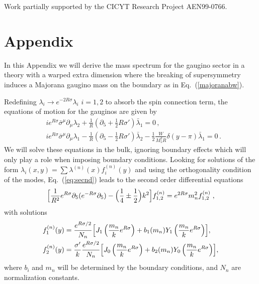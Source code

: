 \documentclass[a4paper,12pt]{article}
\begin{document}
Work  partially supported by the CICYT Research Project
AEN99-0766.

\newpage

\section*{Appendix}

In this Appendix we will derive the mass spectrum  for the gaugino
sector in a theory with a warped extra dimension 
where the breaking of supersymmetry 
induces a 
Majorana gaugino mass on the boundary as in Eq.~(\ref{majoranabw}).

Redefining $\lambda_i \rightarrow
e^{-2R\sigma} \lambda_i$ $i=1,2$ to absorb the spin connection term, the
equations of motion for the gauginos are given by
\begin{align}
    &i e^{R\sigma }\bar{\sigma}^{\mu}\partial_{\mu} \lambda_{2} +
  \frac{1}{R}(\partial_{5} + \frac{1}{2}R \sigma')\bar{\lambda}_1 = 0\, ,
\nonumber\\
    &i e^{R\sigma }\bar{\sigma}^{\mu}\partial_{\mu} \lambda_{1} -
    \frac{1}{R}(\partial_{5} - \frac{1}{2}R \sigma')\bar{\lambda}_2 -
    \frac{1}{2}\frac{W}{M_{5}^{3} R} \delta(y - \pi) 
\bar{\lambda}_{1}= 0\, . 
\label{eq:secnd}
\end{align}
We will solve these equations in the bulk, ignoring boundary effects
which will only play a role when imposing boundary conditions. Looking for
solutions of the form $\lambda_i(x,y)= \sum \lambda^{(n)}(x)
f^{(n)}_{i}(y)$ and using the orthogonality condition of the
modes, Eq.~(\ref{eq:secnd}) leads to
the second order differential equations
\begin{equation}
\Bigl[\frac{1}{R^2}
e^{R\sigma }\partial_{5}(e^{-R\sigma } \partial_{5}) -
\Bigl(\frac{1}{4}\pm \frac{1}{2}\Bigr)k^{2}\Bigr]
f^{(n)}_{1,2} =  e^{2R \sigma } m_n^2 f^{(n)}_{1,2}\;,\label{eq:KKdifeq}
\end{equation}
with solutions
\begin{align}
    f^{(n)}_1(y) & = \frac{e^{R\sigma/2}}{N_n} \Bigl[ J_1
    \left(\frac{m_n}{k} e^{R\sigma }\right) + b_1(m_n)
    Y_1\left(\frac{m_n}{k} e^{R\sigma } \right) \Bigr], \\
    f^{(n)}_2(y) & = \frac{\sigma'}{k}
\frac{e^{R\sigma /2}}{N_n} \Bigl[ J_0
    \left(\frac{m_n}{k} e^{R\sigma }\right) + b_2(m_n)
    Y_0\left(\frac{m_n}{k} e^{R\sigma } \right) \Bigr], 
\end{align}
where $b_i$ and $m_n$ will be determined by the boundary 
conditions, and $N_n$ are normalization constants.
    
\end{document}
